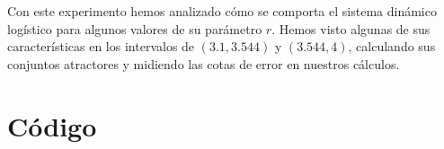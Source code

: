 \documentclass[a4paper]{article}
\begin{document}
	Con este experimento hemos analizado cómo se comporta el sistema dinámico logístico para algunos valores de su parámetro $r$. Hemos visto algunas de sus características en los intervalos de $(3.1,3.544)$ y $(3.544,4)$, calculando sus conjuntos atractores y midiendo las cotas de error en nuestros cálculos.

%	
	
	
%	
%	
%	
%	

	\newpage
	\section{Código}\label{codigo}
	
	
	
\end{document}
